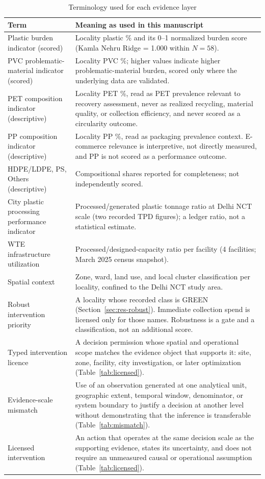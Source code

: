 \documentclass[12pt,a4paper]{article}
\begin{document}
\begin{table}[htbp]
\centering
\caption{Terminology used for each evidence layer}
\label{tab:terminology}
\begin{tabular}{L{4.0cm}L{9.7cm}}
\toprule
\textbf{Term} & \textbf{Meaning as used in this manuscript} \\
\midrule
Plastic burden indicator (scored) & Locality plastic \% and its 0--1 normalized burden score (Kamla Nehru Ridge = 1.000 within $N=58$). \\
PVC problematic-material indicator (scored) & Locality PVC \%; higher values indicate higher problematic-material burden, scored only where the underlying data are validated. \\
PET composition indicator (descriptive) & Locality PET \%, read as PET prevalence relevant to recovery assessment, never as realized recycling, material quality, or collection efficiency, and never scored as a circularity outcome. \\
PP composition indicator (descriptive) & Locality PP \%, read as packaging prevalence context. E-commerce relevance is interpretive, not directly measured, and PP is not scored as a performance outcome. \\
HDPE/LDPE, PS, Others (descriptive) & Compositional shares reported for completeness; not independently scored. \\
City plastic processing performance indicator & Processed/generated plastic tonnage ratio at Delhi NCT scale (two recorded TPD figures); a ledger ratio, not a statistical estimate. \\
WTE infrastructure utilization & Processed/designed-capacity ratio per facility (4 facilities; March 2025 census snapshot). \\
Spatial context & Zone, ward, land use, and local cluster classification per locality, confined to the Delhi NCT study area. \\
Robust intervention priority & A locality whose recorded class is GREEN (Section~\ref{sec:res-robust}). Immediate collection spend is licensed only for those names. Robustness is a gate and a classification, not an additional score. \\
Typed intervention licence & A decision permission whose spatial and operational scope matches the evidence object that supports it: site, zone, facility, city investigation, or later optimization (Table~\ref{tab:licensed}). \\
Evidence-scale mismatch & Use of an observation generated at one analytical unit, geographic extent, temporal window, denominator, or system boundary to justify a decision at another level without demonstrating that the inference is transferable (Table~\ref{tab:mismatch}). \\
Licensed intervention & An action that operates at the same decision scale as the supporting evidence, states its uncertainty, and does not require an unmeasured causal or operational assumption (Table~\ref{tab:licensed}). \\
\bottomrule
\end{tabular}
\end{table}
\end{document}
